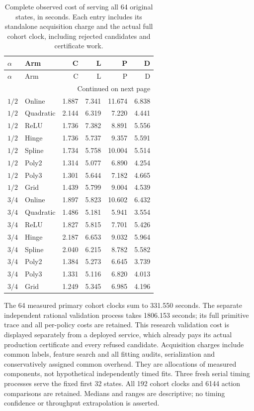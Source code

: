 \begingroup
\scriptsize
\setlength{\tabcolsep}{3pt}
\begin{longtable}{llrrrr}
\caption{Complete observed cost of serving all 64 original states, in seconds. Each entry includes its standalone acquisition charge and the actual full cohort clock, including rejected candidates and certificate work.}\label{tab:cost120}\\
\toprule
$\alpha$ & Arm & C & L & P & D \\ \midrule
\endfirsthead
\toprule
$\alpha$ & Arm & C & L & P & D \\ \midrule
\endhead
\midrule\multicolumn{6}{r}{Continued on next page}\\\endfoot
\bottomrule\endlastfoot
$1/2$ & Online & 1.887 & 7.341 & 11.674 & 6.838 \\
$1/2$ & Quadratic & 2.144 & 6.319 & 7.220 & 4.441 \\
$1/2$ & ReLU & 1.736 & 7.382 & 8.891 & 5.556 \\
$1/2$ & Hinge & 1.736 & 5.737 & 9.357 & 5.591 \\
$1/2$ & Spline & 1.734 & 5.758 & 10.004 & 5.514 \\
$1/2$ & Poly2 & 1.314 & 5.077 & 6.890 & 4.254 \\
$1/2$ & Poly3 & 1.301 & 5.644 & 7.182 & 4.665 \\
$1/2$ & Grid & 1.439 & 5.799 & 9.004 & 4.539 \\
$3/4$ & Online & 1.897 & 5.823 & 10.602 & 6.432 \\
$3/4$ & Quadratic & 1.486 & 5.181 & 5.941 & 3.554 \\
$3/4$ & ReLU & 1.827 & 5.815 & 7.701 & 5.426 \\
$3/4$ & Hinge & 2.187 & 6.653 & 9.032 & 5.964 \\
$3/4$ & Spline & 2.040 & 6.215 & 8.782 & 5.582 \\
$3/4$ & Poly2 & 1.384 & 5.273 & 6.645 & 3.739 \\
$3/4$ & Poly3 & 1.331 & 5.116 & 6.820 & 4.013 \\
$3/4$ & Grid & 1.249 & 5.345 & 6.985 & 4.196 \\
\end{longtable}
\endgroup


The 64 measured primary cohort clocks sum to 331.550 seconds. The separate independent rational validation process takes 1806.153 seconds; its full primitive trace and all per-policy costs are retained. This research validation cost is displayed separately from a deployed service, which already pays its actual production certificate and every refused candidate. Acquisition charges include common labels, feature search and all fitting audits, serialization and conservatively assigned common overhead. They are allocations of measured components, not hypothetical independently timed fits. Three fresh serial timing processes serve the fixed first 32 states. All 192 cohort clocks and 6144 action comparisons are retained. Medians and ranges are descriptive; no timing confidence or throughput extrapolation is asserted.

